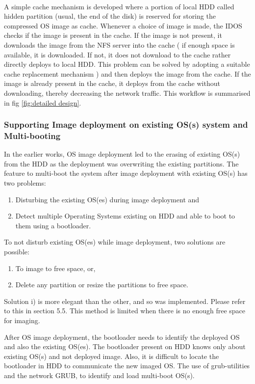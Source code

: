 \documentclass[a4paper,12pt]{article}
\begin{document}
\paragraph{}
A simple cache mechanism is developed where a portion of local HDD called hidden partition (usual, the end of the disk) is reserved for storing the compressed OS image as cache. Whenever a choice of image is made, the IDOS checks if the image is present in the cache. If the image is not present, it downloads the image from the NFS server into the cache ( if enough space is available, it is downloaded. If not, it does not download to the cache rather directly deploys to local HDD. This problem can be solved by adopting a suitable cache replacement mechanism ) and then deploys the image from the cache. If the image is already present in the cache, it deploys from the cache without downloading, thereby decreasing the network traffic. This workflow is summarised in fig \ref{fig:detailed design}.

\subsubsection{ Supporting Image deployment on existing OS(s) system and Multi-booting}
In the earlier works, OS image deployment led to the erasing of existing OS(s) from the HDD as the deployment was overwriting the existing partitions. The feature to multi-boot the system after image deployment with existing OS(s) has two problems: 
\begin{enumerate}[label=\roman*.]
    \item  Disturbing the existing OS(es) during image deployment and 
    \item Detect multiple Operating Systems existing on HDD and able to boot to them using a bootloader.
\end{enumerate}
To not disturb existing OS(es) while image deployment, two solutions are possible:
\begin{enumerate}[label=\roman*.]
    \item To image to free space, or,
     \item Delete any partition or resize the partitions to free space.
\end{enumerate}

Solution i) is more elegant than the other, and so was implemented. Please refer to this in section 5.5. This method is limited when there is no enough free space for imaging.

After OS image deployment, the bootloader needs to identify the deployed OS and also the existing OS(es). The bootloader present on HDD knows only about existing OS(s) and not deployed image. Also, it is difficult to locate the bootloader in HDD to communicate the new imaged OS. The use of grub-utilities and the network GRUB, to identify and load multi-boot OS(s).
\end{document}
